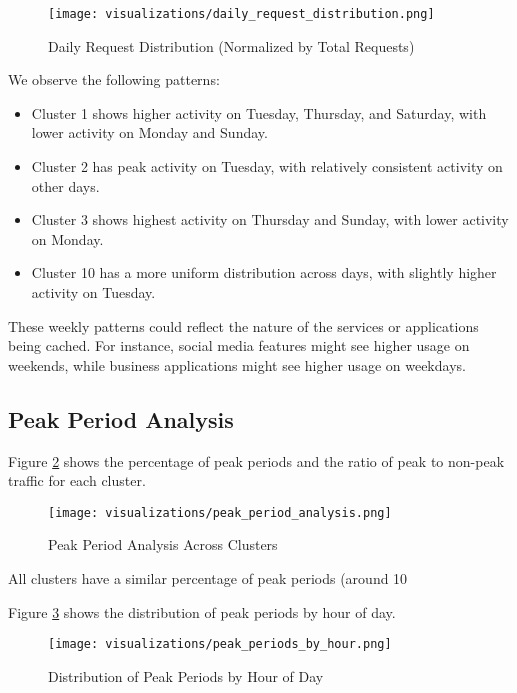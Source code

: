 \documentclass[conference]{IEEEtran}
\begin{document}
\begin{figure}[htbp]
    \centering
    \texttt{[image: visualizations/daily\_request\_distribution.png]}
    \caption{Daily Request Distribution (Normalized by Total Requests)}
    \label{fig:daily_request}
\end{figure}

We observe the following patterns:
\begin{itemize}
    \item Cluster 1 shows higher activity on Tuesday, Thursday, and Saturday, with lower activity on Monday and Sunday.
    \item Cluster 2 has peak activity on Tuesday, with relatively consistent activity on other days.
    \item Cluster 3 shows highest activity on Thursday and Sunday, with lower activity on Monday.
    \item Cluster 10 has a more uniform distribution across days, with slightly higher activity on Tuesday.
\end{itemize}

These weekly patterns could reflect the nature of the services or applications being cached. For instance, social media features might see higher usage on weekends, while business applications might see higher usage on weekdays.

\subsection{Peak Period Analysis}
Figure \ref{fig:peak_period} shows the percentage of peak periods and the ratio of peak to non-peak traffic for each cluster.

\begin{figure}[htbp]
    \centering
    \texttt{[image: visualizations/peak\_period\_analysis.png]}
    \caption{Peak Period Analysis Across Clusters}
    \label{fig:peak_period}
\end{figure}

All clusters have a similar percentage of peak periods (around 10%

Figure \ref{fig:peak_hour} shows the distribution of peak periods by hour of day.

\begin{figure}[htbp]
    \centering
    \texttt{[image: visualizations/peak\_periods\_by\_hour.png]}
    \caption{Distribution of Peak Periods by Hour of Day}
    \label{fig:peak_hour}
\end{figure}
\end{document}

